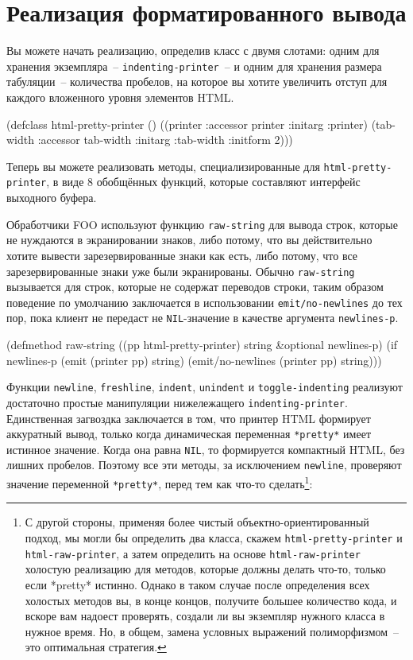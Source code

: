 \section{Реализация форматированного вывода}

Вы можете начать реализацию, определив класс с двумя слотами: одним для хранения
экземпляра~-- \lstinline{indenting-printer}~-- и одним для хранения размера табуляции~--
количества пробелов, на которое вы хотите увеличить отступ для каждого вложенного уровня
элементов HTML.

\begin{myverb}
(defclass html-pretty-printer ()
  ((printer   :accessor printer   :initarg :printer)
   (tab-width :accessor tab-width :initarg :tab-width :initform 2)))
\end{myverb}

Теперь вы можете реализовать методы, специализированные для \lstinline{html-pretty-printer}, в
виде 8 обобщённых функций, которые составляют интерфейс выходного буфера.

Обработчики FOO используют функцию \lstinline{raw-string} для вывода строк, которые не
нуждаются в экранировании знаков, либо потому, что вы действительно хотите вывести
зарезервированные знаки как есть, либо потому, что все зарезервированные знаки уже были
экранированы. Обычно \lstinline{raw-string} вызывается для строк, которые не содержат переводов
строки, таким образом поведение по умолчанию заключается в использовании
\lstinline{emit/no-newlines} до тех пор, пока клиент не передаст не \lstinline{NIL}-значение в
качестве аргумента \lstinline{newlines-p}.

\begin{myverb}
(defmethod raw-string ((pp html-pretty-printer) string &optional newlines-p)
  (if newlines-p
    (emit (printer pp) string)
    (emit/no-newlines (printer pp) string)))
\end{myverb}

Функции \lstinline{newline}, \lstinline{freshline}, \lstinline{indent}, \lstinline{unindent} и
\lstinline{toggle-indenting} реализуют достаточно простые манипуляции нижележащего
\lstinline{indenting-printer}. Единственная загвоздка заключается в том, что принтер HTML
формирует аккуратный вывод, только когда динамическая переменная \lstinline{*pretty*} имеет
истинное значение. Когда она равна \lstinline{NIL}, то формируется компактный HTML, без лишних
пробелов. Поэтому все эти методы, за исключением \lstinline{newline}, проверяют значение
переменной \lstinline{*pretty*}, перед тем как что-то сделать\footnote{С другой стороны,
  применяя более чистый объектно-ориентированный подход, мы могли бы определить два
  класса, скажем \lstinline{html-pretty-printer} и \lstinline{html-raw-printer}, а затем определить
  на основе \lstinline{html-raw-printer} холостую реализацию для методов, которые должны делать
  что-то, только если *pretty* истинно. Однако в таком случае после определения всех
  холостых методов вы, в конце концов, получите большее количество кода, и вскоре вам
  надоест проверять, создали ли вы экземпляр нужного класса в нужное время. Но, в общем,
  замена условных выражений полиморфизмом~-- это оптимальная стратегия.}:

